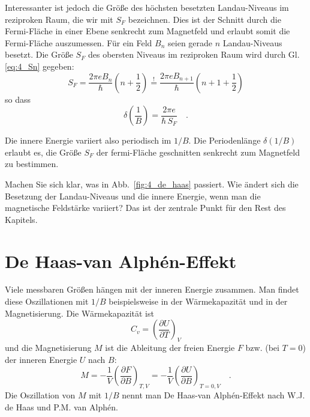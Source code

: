 Interessanter ist jedoch die Größe des höchsten besetzten Landau-Niveaus im reziproken Raum, die wir mit $S_F$ bezeichnen. Dies ist der Schnitt durch die Fermi-Fläche in einer Ebene senkrecht zum Magnetfeld und erlaubt somit die  Fermi-Fläche auszumessen. Für ein Feld $B_n$ seien gerade $n$ Landau-Niveaus besetzt. Die Größe $S_F$ des obersten Niveaus im reziproken Raum wird durch Gl. \ref{eq:4_Sn} gegeben:
\begin{equation}
   S_F =  \frac{2 \pi e B_n}{\hbar} \left( n + \frac{1}{2}\right)  \overset{!}{=} \frac{2 \pi e B_{n+1}}{\hbar} \left( n + 1+ \frac{1}{2}\right)  
\end{equation}
so dass
\begin{equation}
   \delta \left(\frac{1}{B}  \right) = \frac{2 \pi e }{\hbar \, S_F} \quad .
\end{equation}

Die innere Energie variiert also periodisch im $1/B$. Die Periodenlänge $ \delta \left(1/B  \right)$ erlaubt es, die   Größe $S_F$ der fermi-Fläche geschnitten senkrecht zum Magnetfeld zu bestimmen.

\begin{questions}
   \item Machen Sie sich klar, was in Abb.~\ref{fig:4_de_haas} passiert. Wie ändert sich die Besetzung der Landau-Niveaus und die innere Energie, wenn man die magnetische Feldstärke variiert? Das ist der zentrale Punkt für den Rest des Kapitels.
\end{questions}

\section{De Haas-van Alphén-Effekt}

Viele messbaren Größen hängen mit der  inneren Energie zusammen. Man findet diese Oszillationen mit $1/B$ beispielsweise in der Wärmekapazität  und in der Magnetisierung. Die Wärmekapazität ist
\begin{equation}
   C_v =  \left(\frac{\partial U}{ \partial T} \right)_{V} 
\end{equation}
und die Magnetisierung $M$ ist die Ableitung der freien Energie $F$ bzw. (bei $T=0$) der inneren Energie $U$ nach $B$:
\begin{equation}
   M = - \frac{1}{V} \left(\frac{\partial F}{ \partial B} \right)_{T,V} 
     = - \frac{1}{V} \left(\frac{\partial U}{ \partial B} \right)_{T=0,V} \quad .
\end{equation}
Die Oszillation von $M$ mit $1/B$ nennt man De Haas-van Alphén-Effekt nach W.J. de Haas und P.M. van Alphén.

